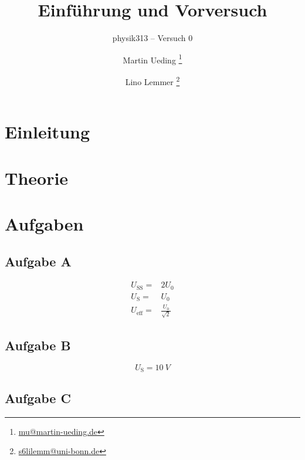 



\subject{Praktikumsprotokoll}
\title{Einführung und Vorversuch}
\subtitle{physik313 – Versuch 0}
\author{
	Martin Ueding \footnote{\href{mailto:mu@martin-ueding.de}{mu@martin-ueding.de}}
	\and
	Lino Lemmer \footnote{\href{mailto:s6lilemm@uni-bonn.de}{s6lilemm@uni-bonn.de}}
}



\maketitle


\section{Einleitung}

\section{Theorie}

\section{Aufgaben}

\subsection{Aufgabe A}

\begin{align*}
	U_\text{SS}=&2U_0\\
	U_\text{S}=&U_0\\
	U_\text{eff}=&\frac{U_0}{\sqrt{2}}
\end{align*}

\subsection{Aufgabe B}

\[U_\text{S}=\SI{10}{V}\]

\subsection{Aufgabe C}

